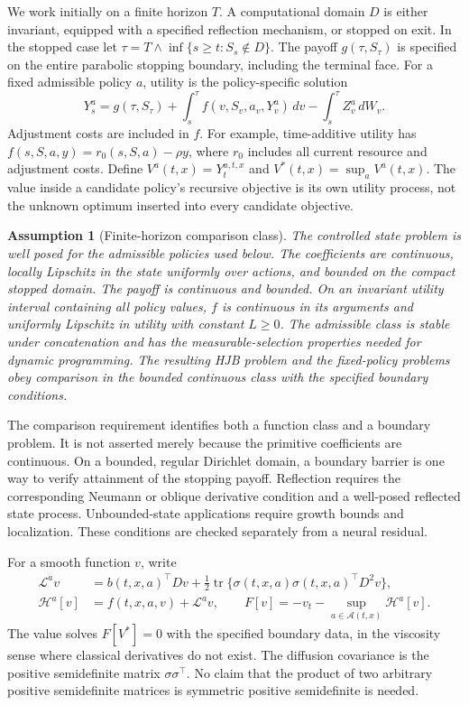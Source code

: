 \documentclass[ecta,draft]{econsocart}
\newtheorem{assumption}{Assumption}
\theoremstyle{definition}
\theoremstyle{remark}
\newcommand{\HH}{\mathcal H}
\newcommand{\LL}{\mathcal L}
\newcommand{\Act}{\mathcal A}
\newcommand{\tr}{\operatorname{tr}}
\begin{document}
We work initially on a finite horizon $T$. A computational domain $D$ is either invariant, equipped with a specified reflection mechanism, or stopped on exit. In the stopped case let $\tau=T\wedge\inf\{s\geq t:S_s\notin D\}$. The payoff $g(\tau,S_\tau)$ is specified on the entire parabolic stopping boundary, including the terminal face. For a fixed admissible policy $a$, utility is the policy-specific solution
\begin{equation}\label{eq:bsde}
 Y_s^a=g(\tau,S_\tau)+\int_s^\tau f(v,S_v,a_v,Y_v^a)\,dv
                    -\int_s^\tau Z_v^a\,dW_v.
\end{equation}
Adjustment costs are included in $f$. For example, time-additive utility has $f(s,S,a,y)=r_0(s,S,a)-\rho y$, where $r_0$ includes all current resource and adjustment costs. Define $V^a(t,x)=Y_t^{a,t,x}$ and $V^*(t,x)=\sup_a V^a(t,x)$. The value inside a candidate policy's recursive objective is its own utility process, not the unknown optimum inserted into every candidate objective.

\begin{assumption}[Finite-horizon comparison class]\label{ass:model}
The controlled state problem is well posed for the admissible policies used below. The coefficients are continuous, locally Lipschitz in the state uniformly over actions, and bounded on the compact stopped domain. The payoff is continuous and bounded. On an invariant utility interval containing all policy values, $f$ is continuous in its arguments and uniformly Lipschitz in utility with constant $L\geq0$. The admissible class is stable under concatenation and has the measurable-selection properties needed for dynamic programming. The resulting HJB problem and the fixed-policy problems obey comparison in the bounded continuous class with the specified boundary conditions.
\end{assumption}

The comparison requirement identifies both a function class and a boundary problem. It is not asserted merely because the primitive coefficients are continuous. On a bounded, regular Dirichlet domain, a boundary barrier is one way to verify attainment of the stopping payoff. Reflection requires the corresponding Neumann or oblique derivative condition and a well-posed reflected state process. Unbounded-state applications require growth bounds and localization. These conditions are checked separately from a neural residual.

For a smooth function $v$, write
\begin{align}
 \LL^a v&=b(t,x,a)^\top Dv+\tfrac12\tr\{\sigma(t,x,a)\sigma(t,x,a)^\top D^2v\},\label{eq:generator}\\
 \HH^a[v]&=f(t,x,a,v)+\LL^a v,\qquad
 F[v]=-v_t-\sup_{a\in\Act(t,x)}\HH^a[v].\label{eq:hjb}
\end{align}
The value solves $F[V^*]=0$ with the specified boundary data, in the viscosity sense where classical derivatives do not exist. The diffusion covariance is the positive semidefinite matrix $\sigma\sigma^\top$. No claim that the product of two arbitrary positive semidefinite matrices is symmetric positive semidefinite is needed.
\end{document}
